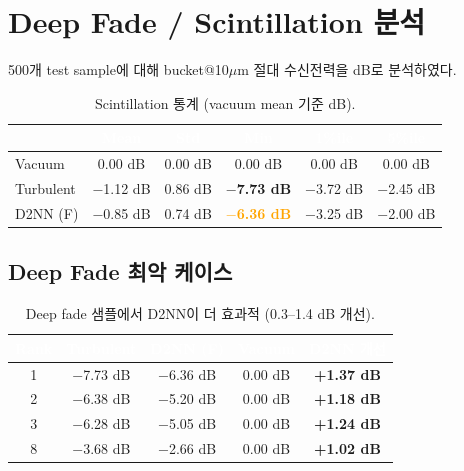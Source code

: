 \documentclass[11pt,a4paper]{article}
\newcommand{\good}[1]{\textcolor{greengood}{\textbf{#1}}}
\newcommand{\bad}[1]{\textcolor{redwarn}{\textbf{#1}}}
\newcommand{\warn}[1]{\textcolor{orange}{\textbf{#1}}}
\begin{document}
\section{Deep Fade / Scintillation 분석}

500개 test sample에 대해 bucket@10$\mu$m 절대 수신전력을 dB로 분석하였다.

\begin{table}[H]
\centering
\begin{tabular}{lccccc}
\toprule
\rowcolor{tableheader}\textcolor{white}{} & \textcolor{white}{\textbf{Mean}} & \textcolor{white}{\textbf{Std}} & \textcolor{white}{\textbf{Min}} & \textcolor{white}{\textbf{1\%ile}} & \textcolor{white}{\textbf{5\%ile}} \\
\midrule
Vacuum & 0.00 dB & 0.00 dB & 0.00 dB & 0.00 dB & 0.00 dB \\
\rowcolor{tablealt}Turbulent & $-$1.12 dB & 0.86 dB & \bad{$-$7.73 dB} & $-$3.72 dB & $-$2.45 dB \\
D2NN (F) & $-$0.85 dB & 0.74 dB & \warn{$-$6.36 dB} & $-$3.25 dB & $-$2.00 dB \\
\bottomrule
\end{tabular}
\caption{Scintillation 통계 (vacuum mean 기준 dB).}
\end{table}

\subsection{Deep Fade 최악 케이스}

\begin{table}[H]
\centering
\small
\begin{tabular}{ccccc}
\toprule
\rowcolor{tableheader}\textcolor{white}{\textbf{Rank}} & \textcolor{white}{\textbf{Turbulent}} & \textcolor{white}{\textbf{D2NN (F)}} & \textcolor{white}{\textbf{Vacuum}} & \textcolor{white}{\textbf{D2NN 개선}} \\
\midrule
1 & $-$7.73 dB & $-$6.36 dB & 0.00 dB & \good{+1.37 dB} \\
\rowcolor{tablealt}2 & $-$6.38 dB & $-$5.20 dB & 0.00 dB & \good{+1.18 dB} \\
3 & $-$6.28 dB & $-$5.05 dB & 0.00 dB & \good{+1.24 dB} \\
\rowcolor{tablealt}8 & $-$3.68 dB & $-$2.66 dB & 0.00 dB & \good{+1.02 dB} \\
\bottomrule
\end{tabular}
\caption{Deep fade 샘플에서 D2NN이 더 효과적 (0.3--1.4 dB 개선).}
\end{table}
\end{document}
